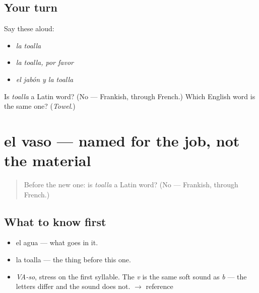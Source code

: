 \subsection*{Your turn}
Say these aloud:

\begin{itemize}
\raggedright
  \item \emph{la toalla}
  \item \emph{la toalla, por favor}
  \item \emph{el jabón y la toalla}
\end{itemize}

\begin{tcolorbox}[breakable,colback=teal!4,colframe=teal!35!black,title={Before you move on}]
Is \emph{toalla} a Latin word? (No — Frankish, through French.) Which English word is the same one? (\emph{Towel}.)
\end{tcolorbox}
\section[el vaso]{el vaso — named for the job, not the material}

\label{lesson:ES-C287-vaso}



\begin{quote}
Before the new one: is \emph{toalla} a Latin word? (No — Frankish, through French.)
\end{quote}

\subsection*{What to know first}
\begin{itemize}
\raggedright
  \item el agua — what goes in it.
  \item la toalla — the thing before this one.
\end{itemize}

\begin{sounds}
\begin{itemize}
\raggedright
  \item \emph{VA-so}, stress on the first syllable. The \emph{v} is the same soft sound as \emph{b} — the letters differ and the sound does not. $\to$ reference
\end{itemize}
\end{sounds}

